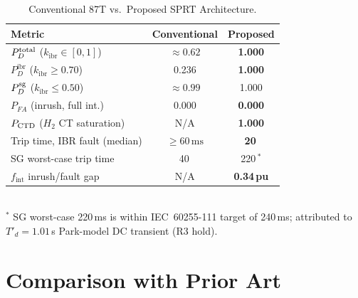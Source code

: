 \documentclass[journal,twoside,10pt]{IEEEtran}
\newcommand{\kibr}{k_{\mathrm{ibr}}}
\newcommand{\ms}{\,\text{ms}}
\newcommand{\fint}{f_{\mathrm{int}}}
\newcommand{\Pdibr}{P_D^{\mathrm{ibr}}}
\begin{document}
\begin{table}[!t]
\centering
\caption{Conventional 87T vs.\ Proposed SPRT Architecture.}
\label{tab:compare}
\renewcommand{\arraystretch}{1.06}
\footnotesize\setlength{\tabcolsep}{4pt}
\begin{tabular}{p{3.2cm}cc}
\toprule
Metric & Conventional & Proposed \\
\midrule
$P_D^{\rm total}$ ($\kibr \in [0,1]$)   & $\approx 0.62$ & \textbf{1.000} \\
$\Pdibr$ ($\kibr \geq 0.70$)             & 0.236          & \textbf{1.000} \\
$P_D^{\rm sg}$ ($\kibr \leq 0.50$)       & $\approx 0.99$ & 1.000 \\
$P_{FA}$ (inrush, full int.)             & 0.000          & \textbf{0.000} \\
$P_{\rm CTD}$ ($H_2$ CT saturation)      & N/A            & \textbf{1.000} \\
Trip time, IBR fault (median)            & $\geq 60\ms$   & \textbf{20\ms} \\
SG worst-case trip time                  & 40\ms          & 220\ms$^*$ \\
$\fint$ inrush/fault gap                 & N/A            & \textbf{0.34\,pu} \\
\bottomrule
\end{tabular}
\medskip\\
\footnotesize{$^*$ SG worst-case 220\,ms is within IEC~60255-111 target of
240\,ms; attributed to $T'_d = 1.01$\,s Park-model DC transient (R3 hold).}
\end{table}

\section{Comparison with Prior Art}
\label{sec:comparison}
\end{document}
